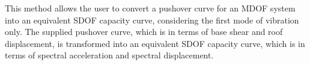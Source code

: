 This method allows the user to convert a pushover curve for an MDOF system into an equivalent SDOF capacity curve, considering the first mode of vibration only. The supplied pushover curve, which is in terms of base shear and roof displacement, is transformed into an equivalent SDOF capacity curve, which is in terms of spectral acceleration and spectral displacement.